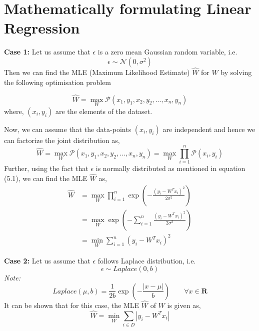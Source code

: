 \documentclass[11pt]{article}
\begin{document}
\section{Mathematically formulating Linear Regression}
\textbf{Case 1:}
Let us assume that $\epsilon$ is a zero mean Gaussian random variable, i.e. 
\begin{equation}
    \epsilon \sim \mathcal{N} (0, \sigma^2)
\end{equation}
Then we can find the MLE (Maximum Likelihood Estimate) $\hat{W}$ for $W$ by solving the following optimisation problem

\begin{equation*}
    \hat{W} = \max_{W} \mathcal{P} (x_1, y_1, x_2, y_2, ... , x_n, y_n) 
\end{equation*}
where, $(x_i, y_i)$ are the elements of the dataset.

Now, we can assume that the data-points $(x_i, y_i)$ are independent and hence we can factorize the joint distribution as,
\begin{equation*}
    \hat{W} = \max_{W} \mathcal{P} (x_1, y_1, x_2, y_2, ... , x_n, y_n) = \max_{W} \prod_{i = 1}^{n} \mathcal{P} (x_i, y_i)
\end{equation*}
Further, using the fact that $\epsilon$ is normally distributed as mentioned in equation (5.1), we can find the MLE $\hat{W}$ as,
\begin{align*}
        \hat{W} &= \max_{W} \prod_{i = 1}^{n} \exp ({- \frac{(y_i - W^T x_i)^2}{2\sigma^2}}) \\
        &= \max_W \exp(-\sum_{i = 1}^{n} {\frac{(y_i - W^T x_i)^2}{2\sigma^2}}) \\
        &= \min_{W} \sum_{i = 1}^{n} (y_i - W^T x_i)^2
\end{align*}

\textbf{Case 2:} Let us assume that $\epsilon$ follows Laplace distribution, i.e.
\begin{equation}
    \epsilon \sim Laplace(0 , b)
\end{equation}
\textit{Note:} 
\begin{equation*}
    Laplace (\mu, b) = \frac{1}{2b} \exp(- \frac{|x - \mu|}{b}) \quad \quad \forall x \in \mathbf{R} 
\end{equation*}
It can be shown that for this case, the MLE $\hat{W}$ of $W$ is given as,
\begin{equation*}
    \hat{W} = \min_W \sum_{i \in D} |y_i - W^T x_i|
\end{equation*}
\end{document}
